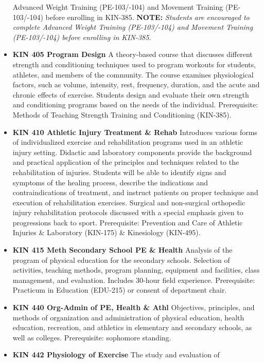 \documentclass[
  letterpaper,
]{scrbook}
\begin{document}
\begin{itemize}
  Advanced Weight Training (PE-103/-104) and Movement Training
  (PE-103/-104) before enrolling in KIN-385. \textbf{NOTE:}
  \emph{Students are encouraged to complete Advanced Weight Training
  (PE-103/-104) and Movement Training (PE-103/-104) before enrolling in
  KIN-385.}
\item
  \textbf{KIN 405 Program Design} A theory-based course that discusses
  different strength and conditioning techniques used to program
  workouts for students, athletes, and members of the community. The
  course examines physiological factors, such as volume, intensity,
  rest, frequency, duration, and the acute and chronic effects of
  exercise. Students design and evaluate their own strength and
  conditioning programs based on the needs of the individual.
  Prerequisite: Methods of Teaching Strength Training and Conditioning
  (KIN-385).
\item
  \textbf{KIN 410 Athletic Injury Treatment \& Rehab} Introduces various
  forms of individualized exercise and rehabilitation programs used in
  an athletic injury setting. Didactic and laboratory components provide
  the background and practical application of the principles and
  techniques related to the rehabilitation of injuries. Students will be
  able to identify signs and symptoms of the healing process, describe
  the indications and contraindications of treatment, and instruct
  patients on proper technique and execution of rehabilitation
  exercises. Surgical and non-surgical orthopedic injury rehabilitation
  protocols discussed with a special emphasis given to progressions back
  to sport. Prerequisite: Prevention and Care of Athletic Injuries \&
  Laboratory (KIN-175) \& Kinesiology (KIN-495).
\item
  \textbf{KIN 415 Meth Secondary School PE \& Health} Analysis of the
  program of physical education for the secondary schools. Selection of
  activities, teaching methods, program planning, equipment and
  facilities, class management, and evaluation. Includes 30-hour field
  experience. Prerequisite: Practicum in Education (EDU-215) or consent
  of department chair.
\item
  \textbf{KIN 440 Org-Admin of PE, Health \& Athl} Objectives,
  principles, and methods of organization and administration of physical
  education, health education, recreation, and athletics in elementary
  and secondary schools, as well as colleges. Prerequisite: sophomore
  standing.
\item
  \textbf{KIN 442 Physiology of Exercise} The study and evaluation of

\end{itemize}
\end{document}
